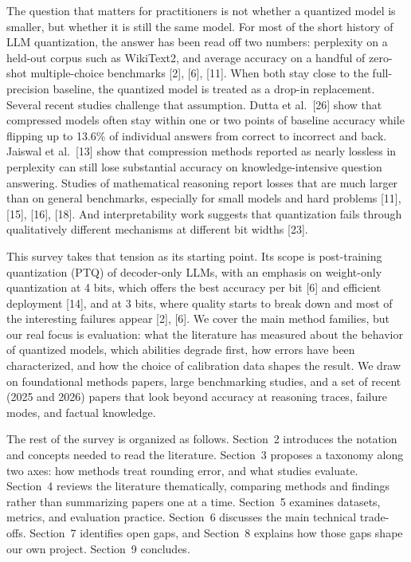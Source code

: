 \documentclass[10pt,twocolumn]{article}
\begin{document}
The question that matters for practitioners is not whether a quantized
model is smaller, but whether it is still the same model. For most of
the short history of LLM quantization, the answer has been read off two
numbers: perplexity on a held-out corpus such as WikiText2, and average
accuracy on a handful of zero-shot multiple-choice benchmarks [2], [6],
[11]. When both stay close to the full-precision baseline, the quantized
model is treated as a drop-in replacement. Several recent studies
challenge that assumption. Dutta et al.~[26] show that compressed models
often stay within one or two points of baseline accuracy while flipping
up to 13.6\% of individual answers from correct to incorrect and back.
Jaiswal et al.~[13] show that compression methods reported as nearly
lossless in perplexity can still lose substantial accuracy on
knowledge-intensive question answering. Studies of mathematical
reasoning report losses that are much larger than on general
benchmarks, especially for small models and hard problems [11], [15],
[16], [18]. And interpretability work suggests that quantization fails
through qualitatively different mechanisms at different bit widths [23].

This survey takes that tension as its starting point. Its scope is
post-training quantization (PTQ) of decoder-only LLMs, with an emphasis
on weight-only quantization at 4 bits, which offers the best accuracy
per bit [6] and efficient deployment [14], and at 3 bits, where quality
starts to break down and most of the interesting failures appear [2],
[6]. We cover the main method families, but our real focus is
evaluation: what the literature has measured about the behavior of
quantized models, which abilities degrade first, how errors have been
characterized, and how the choice of calibration data shapes the result.
We draw on foundational methods papers, large benchmarking studies, and
a set of recent (2025 and 2026) papers that look beyond accuracy at
reasoning traces, failure modes, and factual knowledge.

The rest of the survey is organized as follows. Section~2 introduces the
notation and concepts needed to read the literature. Section~3 proposes
a taxonomy along two axes: how methods treat rounding error, and what
studies evaluate. Section~4 reviews the literature thematically,
comparing methods and findings rather than summarizing papers one at a
time. Section~5 examines datasets, metrics, and evaluation practice.
Section~6 discusses the main technical trade-offs. Section~7 identifies
open gaps, and Section~8 explains how those gaps shape our own project.
Section~9 concludes.
\end{document}
